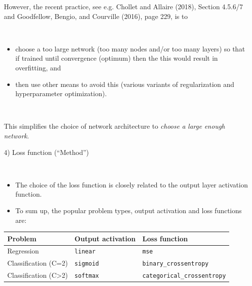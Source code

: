 \documentclass[10pt,ignorenonframetext,]{beamer}
\providecommand{\tightlist}{%
  \setlength{\itemsep}{0pt}\setlength{\parskip}{0pt}}
\begin{document}
\begin{frame}

However, the recent practice, see e.g. Chollet and Allaire (2018),
Section 4.5.6/7 and Goodfellow, Bengio, and Courville (2016), page 229,
is to

\(~\)

\begin{itemize}
\tightlist
\item
  choose a too large network (too many nodes and/or too many layers) so
  that if trained until convergence (optimum) then the this would result
  in overfitting, and
\end{itemize}

\vspace{2mm}

\begin{itemize}
\tightlist
\item
  then use other means to avoid this (various variants of regularization
  and hyperparameter optimization).
\end{itemize}

\(~\)

This simplifies the choice of network architecture to \emph{choose a
large enough network}.

\end{frame}

\begin{frame}[fragile]

\begin{block}{4) Loss function (``Method'')}

\(~\)

\begin{itemize}
\item
  The choice of the loss function is closely related to the output layer
  activation function.
\item
  To sum up, the popular problem types, output activation and loss
  functions are:
\end{itemize}

\begin{longtable}[]{@{}lll@{}}
\toprule
Problem & Output activation & Loss function\tabularnewline
\midrule
\endhead
Regression & \texttt{linear} & \texttt{mse}\tabularnewline
Classification (C=2) & \texttt{sigmoid} &
\texttt{binary\_crossentropy}\tabularnewline
Classification (C\textgreater{}2) & \texttt{softmax} &
\texttt{categorical\_crossentropy}\tabularnewline
\bottomrule
\end{longtable}

\end{block}

\end{frame}
\end{document}
